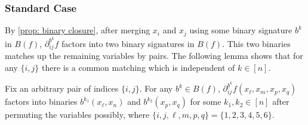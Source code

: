 \subsubsection{Standard Case}
By \cref{prop: binary closure}, after merging $x_i$ and $x_j$ using some binary signature $b^k$ in $B(f)$, $\partial_{ij}^{b^k}f$ factors into two binary signatures in $B(f)$. 
This two binaries matches up the remaining variables by pairs.
The following lemma shows that for any $\{i,j\}$ there is a common matching which is independent of $k\in [n]$.
\begin{lemma}\label{lm: common matching Cn}
    Fix an arbitrary pair of indices $\{i,j\}$.
    For any $b^k\in B(f)$, $\partial_{ij}^{b^k}f(x_\ell,x_m,x_p,x_q)$ factors into binaries $b^{k_1}(x_\ell,x_n)$ and $b^{k_2}(x_p,x_q)$ for some $k_1,k_2\in [n]$ after permuting the variables possibly, where $\{i,j,\ell,m,p,q\}=\{1,2,3,4,5,6\}$.
\end{lemma}
